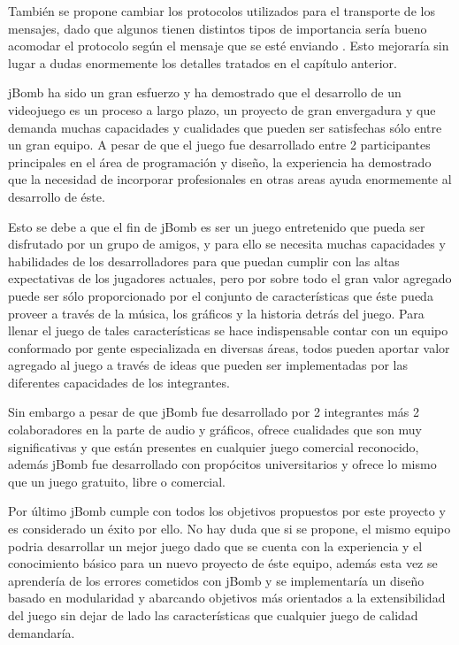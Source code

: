 \documentclass[a4paper,12pt,openany,oneside]{book}
\begin{document}
También se propone cambiar los protocolos utilizados para el transporte de los mensajes, dado que algunos tienen distintos tipos de importancia sería bueno acomodar el protocolo según el mensaje que se esté enviando \cite{VALVE1}. Esto mejoraría sin lugar a dudas enormemente los detalles tratados en el capítulo anterior.

jBomb ha sido un gran esfuerzo y ha demostrado que el desarrollo de un videojuego es un proceso a largo plazo, un proyecto de gran envergadura y que demanda muchas capacidades y cualidades que pueden ser satisfechas sólo entre un gran equipo. A pesar de que el juego fue desarrollado entre 2 participantes principales en el área de programación y diseño, la experiencia ha demostrado que la necesidad de incorporar profesionales en otras areas ayuda enormemente al desarrollo de éste.

Esto se debe a que el fin de jBomb es ser un juego entretenido que pueda ser disfrutado por un grupo de amigos, y para ello se necesita muchas capacidades y habilidades de los desarrolladores para que puedan cumplir con las altas expectativas de los jugadores actuales, pero por sobre todo el gran valor agregado puede ser sólo proporcionado por el conjunto de características que éste pueda proveer a través de la música, los gráficos y la historia detrás del juego. Para llenar el juego de tales características se hace indispensable contar con un equipo conformado por gente especializada en diversas áreas, todos pueden aportar valor agregado al juego a través de ideas que pueden ser implementadas por las diferentes capacidades de los integrantes.

Sin embargo a pesar de que jBomb fue desarrollado por 2 integrantes más 2 colaboradores en la parte de audio y gráficos, ofrece cualidades que son muy significativas y que están presentes en cualquier juego comercial reconocido, además jBomb fue desarrollado con propócitos universitarios y ofrece lo mismo que un juego gratuito, libre o comercial.

Por último jBomb cumple con todos los objetivos propuestos por este proyecto y es considerado un éxito por ello. No hay duda que si se propone, el mismo equipo podria desarrollar un mejor juego dado que se cuenta con la experiencia y el conocimiento básico para un nuevo proyecto de éste equipo, además esta vez se aprendería de los errores cometidos con jBomb y se implementaría un diseño basado en modularidad y abarcando objetivos más orientados a la extensibilidad del juego sin dejar de lado las características que cualquier juego de calidad demandaría.


\end{document}
